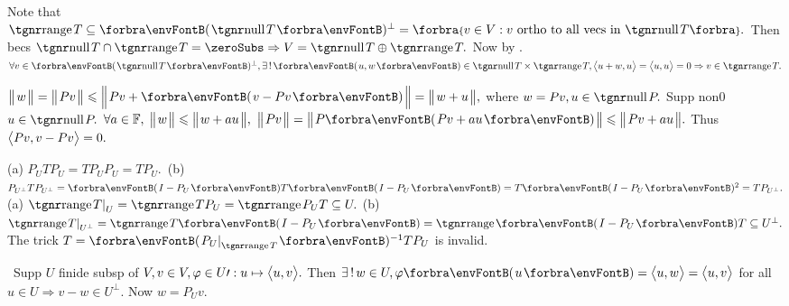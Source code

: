 Note that $\range T\subseteq\Par{\null T}{^\perp}=\Bra{v\in V:v\text{ ortho to all vecs in }\null T}.$\parSol{}
Then becs $\null T\cap\range T=\zeroSubs\Rightarrow V=\null T\oplus\range T.$ Now by .\parSol{}
\Or $\forall v\in\Par{\null T}{^\perp},\exists\,!\,\Par{u,w}\in\null T\times\range T,\Ang{u+w,u}=\Ang{u,u}=0\Rightarrow v\in\range T.$\PfEnd
\SepLine

$\Dvert{w}=\Dvert{Pv}\leqslant\BigDvert{Pv+\Par{v-Pv}}=\Dvert{w+u},$ where $w=Pv,u\in\null P.$ \;Supp non0 $u\in\null P.$\parSol{}
$\forall a\in{\mathbb{F}},\;\big\Vert\hspace{1pt}{}w{}\hspace{1pt}\big\Vert\leqslant\big\Vert\hspace{1pt}{}w+au{}\hspace{1pt}\big\Vert,$ \Or $\Dvert{Pv}=\Dvert{P\Par{Pv+au}}\leqslant\Dvert{Pv+au}.$ \;Thus $\big\langle{}Pv,v-Pv{}\big\rangle=0.$\PfEnd
\SepLine

(a) $P_UTP_U=TP_UP_U=TP_U.$ \,(b) $P_{U^\perp}TP_{U^\perp}=\Par{I-P_U}T\Par{I-P_U}=T\Par{I-P_U}{^2}=TP_{U^\perp}.$\vspace{2pt}\PfEnd\parSol{}
\Or (a) $\range T\mmid_U=\range TP_U=\range P_UT\subseteq U.$\parSol{}
\Blind{\Or}(b) $\range T\mmid_{U^\perp}=\range T\Par{I-P_U}=\range\Par{I-P_U}T\subseteq U^\perp.$\PfEnd\parSol{}
\Blind{\Or}\AComm The trick $T=\Par{P_U\mmid_{\range T}}{^{-1}}TP_U$ is invalid.
\SepLine

\BulletPointX{}\,\,\,Supp $U$ finide subsp of $V,v\in V,\varphi\in U\prime:u\mapsto\big\langle{}u,v{}\big\rangle.$\TextB{}
{}Then $\exists\,!\,w\in U,\varphi\Par{u}=\Ang{u,w}=\Ang{u,v}$ for all $u\in U\Rightarrow v-w\in U^\perp.$ Now $w=P_Uv.$
\SepLine


\ChEnd
\vspace{8pt}

